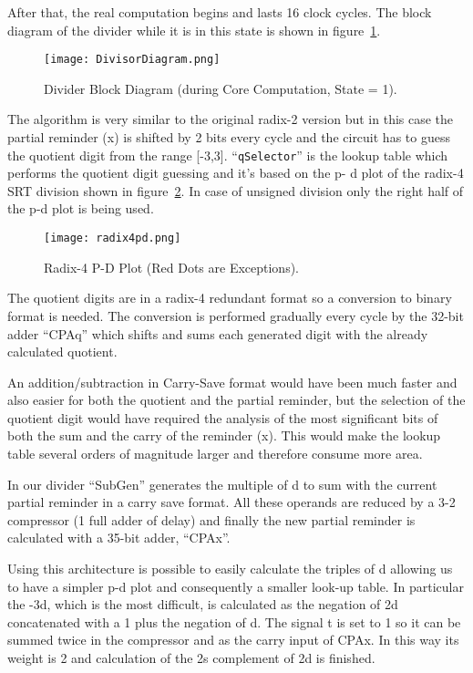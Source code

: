 After that, the real computation begins and lasts 16 clock cycles. The block diagram of the divider
while it is in this state is shown in figure~\ref{fig:div_block_dia}.

\begin{figure}[H]
\centering
\texttt{[image: DivisorDiagram.png]}
\caption{Divider Block Diagram (during Core Computation, State = 1).}
\label{fig:div_block_dia}
\end{figure}

The algorithm is very similar to the original radix-2 version but in this case the partial reminder (x)
is shifted by 2 bits every cycle and the circuit has to guess the quotient digit from the range [-3,3].
``\texttt{qSelector}'' is the lookup table which performs the quotient digit guessing and it's based on the p-
d plot of the radix-4 SRT division shown in figure~\ref{fig:div_pd_plot}. In case of unsigned division only the right half of
the p-d plot is being used.

\begin{figure}[H]
\centering
\texttt{[image: radix4pd.png]}
\caption{Radix-4 P-D Plot (Red Dots are Exceptions).}
\label{fig:div_pd_plot}
\end{figure}

The quotient digits are in a radix-4 redundant format so a conversion to binary format is needed.
The conversion is performed gradually every cycle by the 32-bit adder ``CPAq'' which shifts and sums
each generated digit with the already calculated quotient.

An addition/subtraction in Carry-Save format would have been much faster and also easier for both the quotient and the partial reminder, but the selection of the quotient digit would have required the analysis of the most significant bits of
both the sum and the carry of the reminder (x). This would make the lookup table several orders of magnitude larger and therefore consume more area.

In our divider ``SubGen'' generates the multiple of d to sum with the current partial reminder in a
carry save format. All these operands are reduced by a 3-2 compressor (1 full adder of
delay) and finally the new partial reminder is calculated with a 35-bit adder, ``CPAx''.

Using this architecture is possible to easily calculate the triples of d allowing us to have a simpler p-d plot and consequently a smaller look-up table. In particular the -3d, which is the most difficult, is calculated as the negation of 2d concatenated with a 1 plus the negation of d. The signal t is set to 1 so it can be summed twice in the compressor and as the carry input of CPAx. In this way its weight is 2 and calculation of the 2s complement of 2d is finished.

